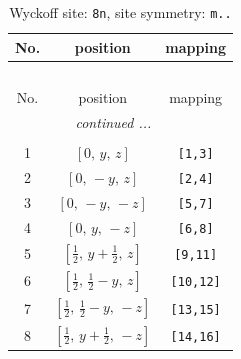 \documentclass[fleqn,8pt]{jsarticle}
\begin{document}
\begin{longtable}{ccc}
\caption{Wyckoff site: {\tt 8n}, site symmetry: {\tt m..}}
 \\
 \hline \hline
No. & position & mapping \\ \hline \endfirsthead

\multicolumn{2}{l}{\tablename\ \thetable{}} \\
 \hline \hline
No. & position & mapping \\ \hline \endhead

 \hline \hline
\multicolumn{2}{r}{\footnotesize\it continued ...} \\ \endfoot

 \hline \hline
\multicolumn{2}{r}{} \\ \endlastfoot

1 & $\left[ 0,\, y,\, z \right]$ & {\tt [1,3]} \\ \hline
2 & $\left[ 0,\, - y,\, z \right]$ & {\tt [2,4]} \\ \hline
3 & $\left[ 0,\, - y,\, - z \right]$ & {\tt [5,7]} \\ \hline
4 & $\left[ 0,\, y,\, - z \right]$ & {\tt [6,8]} \\ \hline
5 & $\left[ \frac{1}{2},\, y + \frac{1}{2},\, z \right]$ & {\tt [9,11]} \\ \hline
6 & $\left[ \frac{1}{2},\, \frac{1}{2} - y,\, z \right]$ & {\tt [10,12]} \\ \hline
7 & $\left[ \frac{1}{2},\, \frac{1}{2} - y,\, - z \right]$ & {\tt [13,15]} \\ \hline
8 & $\left[ \frac{1}{2},\, y + \frac{1}{2},\, - z \right]$ & {\tt [14,16]} \\
\end{longtable}
\renewcommand{\arraystretch}{1.2}
\end{document}
